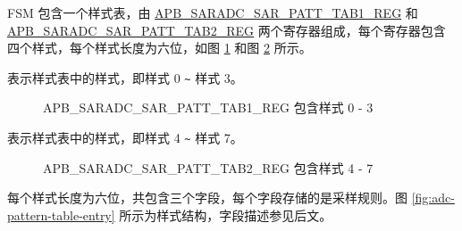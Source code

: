 \documentclass[main\_\_CN.tex]{subfiles}
\begin{document}
FSM 包含一个样式表，由 \hyperref[regdesc:APBSARADCSARPATTTAB1REG]{APB\_SARADC\_SAR\_PATT\_TAB1\_REG} 和 \hyperref[regdesc:APBSARADCSARPATTTAB1REG]{APB\_SARADC\_SAR\_PATT\_TAB2\_REG} 两个寄存器组成，每个寄存器包含四个样式，每个样式长度为六位，如图 \ref{fig:adc-apb-saradc-sar-patt-tab1-reg-pattern-tab-entry0-entry3} 和图 \ref{fig:adc-apb-saradc-sar-patt-tab2-reg-pattern-tab-entry4-entry7} 所示。

%
%
%
%
%
\begin{regdesc}\begin{reglist}
\item [cmd \regindex{x}] 表示样式表中的样式，即样式 0 \verb+~+ 样式 3。
\end{reglist}\end{regdesc}
\vspace{-2em}
\begin{figure}[H]
    \centering
    \caption{APB\_SARADC\_SAR\_PATT\_TAB1\_REG 包含样式 0 - 3}
    \label{fig:adc-apb-saradc-sar-patt-tab1-reg-pattern-tab-entry0-entry3}
\end{figure}

%
%
%
%
%
\begin{regdesc}\begin{reglist}
\item [cmd \regindex{x}] 表示样式表中的样式，即样式 4 \verb+~+ 样式 7。
\end{reglist}\end{regdesc}
\vspace{-2em}
\begin{figure}[H]
    \centering
    \caption{APB\_SARADC\_SAR\_PATT\_TAB2\_REG 包含样式 4 - 7}
    \label{fig:adc-apb-saradc-sar-patt-tab2-reg-pattern-tab-entry4-entry7}
\end{figure}

每个样式长度为六位，共包含三个字段，每个字段存储的是采样规则。图 \ref{fig:adc-pattern-table-entry} 所示为样式结构，字段描述参见后文。
\end{document}
